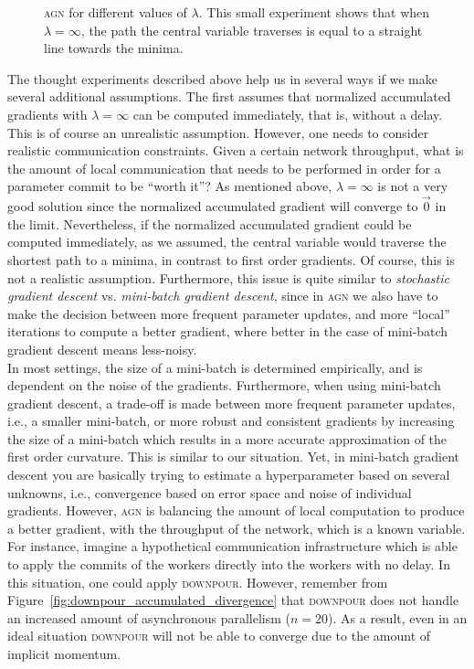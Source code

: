 \documentclass[wcp]{jmlr}
\begin{document}
\begin{figure}
  \centering
  \caption{\textsc{agn} for different values of $\lambda$. This small experiment shows that when $\lambda = \infty$, the path the central variable traverses is equal to a straight line towards the minima.}
  \label{fig:agn_straight_line}
\end{figure}

The thought experiments described above help us in several ways if we make several additional assumptions. The first assumes that normalized accumulated gradients with $\lambda = \infty$ can be computed immediately, that is, without a delay. This is of course an unrealistic assumption. However, one needs to consider realistic communication constraints. Given a certain network throughput, what is the amount of local communication that needs to be performed in order for a parameter commit to be ``worth it''? As mentioned above, $\lambda = \infty$ is not a very good solution since the normalized accumulated gradient will converge to $\vec{0}$ in the limit. Nevertheless, if the normalized accumulated gradient could be computed immediately, as we assumed, the central variable would traverse the shortest path to a minima, in contrast to first order gradients. Of course, this is not a realistic assumption. Furthermore, this issue is quite similar to \emph{stochastic gradient descent} vs. \emph{mini-batch gradient descent}, since in \textsc{agn} we also have to make the decision between more frequent parameter updates, and more ``local'' iterations to compute a better gradient, where better in the case of mini-batch gradient descent means less-noisy.\\

In most settings, the size of a mini-batch is determined empirically, and is dependent on the noise of the gradients. Furthermore, when using mini-batch gradient descent, a trade-off is made between more frequent parameter updates, i.e., a smaller mini-batch, or more robust and consistent gradients by increasing the size of a mini-batch which results in a more accurate approximation of the first order curvature. This is similar to our situation. Yet, in mini-batch gradient descent you are basically trying to estimate a hyperparameter based on several unknowns, i.e., convergence based on error space and noise of individual gradients. However, \textsc{agn} is balancing the amount of local computation to produce a better gradient, with the throughput of the network, which is a known variable. For instance, imagine a hypothetical communication infrastructure which is able to apply the commits of the workers directly into the workers with no delay. In this situation, one could apply \textsc{downpour}. However, remember from Figure~\ref{fig:downpour_accumulated_divergence} that \textsc{downpour} does not handle an increased amount of asynchronous parallelism ($n = 20$). As a result, even in an ideal situation \textsc{downpour} will not be able to converge due to the amount of implicit momentum.\\
\end{document}
